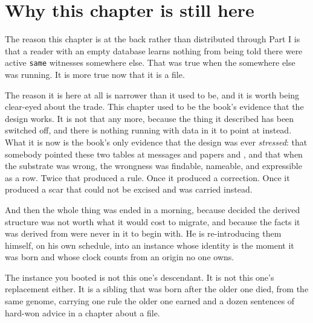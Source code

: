 \section{Why this chapter is still here}

The reason this chapter is at the back rather than distributed through Part I is that a reader with an empty database learns nothing from being told there were \labLineageSameActive{} active \texttt{same} witnesses somewhere else. That was true when the somewhere else was running. It is more true now that it is a file.

The reason it is here at all is narrower than it used to be, and it is worth being clear-eyed about the trade. This chapter used to be the book's evidence that the design works. It is not that any more, because the thing it described has been switched off, and there is nothing running with data in it to point at instead. What it is now is the book's only evidence that the design was ever \emph{stressed}: that somebody pointed these two tables at \labLineageMessagesRound{} messages and \labLineagePapersRound{} papers and \labLineageCalendars{}, and that when the substrate was wrong, the wrongness was findable, nameable, and expressible as a row. Twice that produced a rule. Once it produced a correction. Once it produced a scar that could not be excised and was carried instead.

And then the whole thing was ended in a morning, because \labOwner{} decided the derived structure was not worth what it would cost to migrate, and because the facts it was derived from were never in it to begin with. \labLineageSourcesStillThere{} He is re-introducing them himself, on his own schedule, into an instance whose identity is the moment it was born and whose clock counts from an origin no one owns.

The instance you booted is not this one's descendant. It is not this one's replacement either. It is a sibling that was born after the older one died, from the same genome, carrying one rule the older one earned and a dozen sentences of hard-won advice in a chapter about a file.

